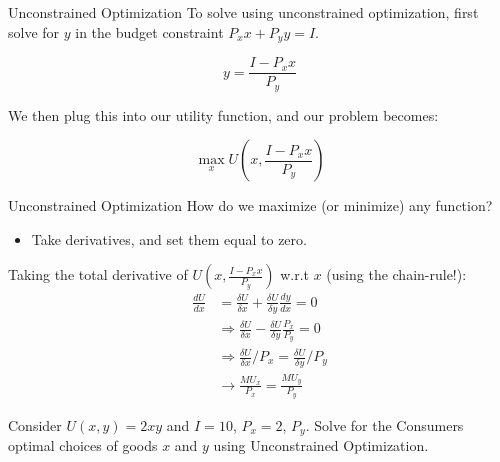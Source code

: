 \documentclass[12pt,t]{beamer}
\begin{document}
\begin{frame}{Unconstrained Optimization}
  To solve using unconstrained optimization, first solve for $y$ in the budget constraint $P_x x + P_y y = I$.

  $$
    y  = \frac{I - P_x x}{P_y} 
  $$

  \pause\bigskip
  We then plug this into our utility function, and our problem becomes:

  $$
    \max_x U(x,\frac{I - P_x x}{P_y}) 
  $$
\end{frame}

\begin{frame}{Unconstrained Optimization}
  How do we maximize (or minimize) any function? \pause
  \begin{itemize}
    \item Take derivatives, and set them equal to zero.
  \end{itemize}
  Taking the total derivative of $U(x,\frac{I - P_x x}{P_y})$ w.r.t $x$ (using the chain-rule!):
  \begin{align*}
    \frac{dU}{dx} & =\frac{\delta U}{\delta x} +\frac{\delta U}{\delta y}\frac{dy}{dx} = 0 \\
    &\Rightarrow \frac{\delta U}{\delta x} -\frac{\delta U}{\delta y}\frac{P_x}{P_y} =0 \\
    &\Rightarrow \frac{\delta U}{\delta x}/{P_x} = \frac{\delta U}{\delta y} /{P_y} \\
    &\rightarrow \frac{MU_x}{P_x} = \frac{MU_y} {P_y}
  \end{align*}
\end{frame}

\begin{frame}
  
  \bigskip
  Consider $U(x,y) = 2xy$ and $I=10$, $P_{x} = 2$, $P_{y}$. Solve for the Consumers optimal choices of goods $x$ and $y$ using Unconstrained Optimization.
\end{frame}
\end{document}
